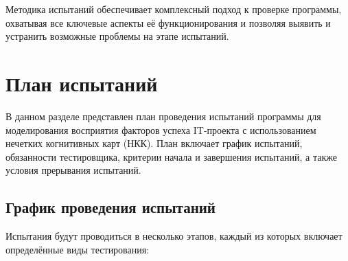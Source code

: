 \documentclass{article}
\begin{document}
    Методика испытаний обеспечивает комплексный подход к проверке программы, охватывая все ключевые аспекты её функционирования и позволяя выявить и устранить возможные проблемы на этапе испытаний.
    \newpage
    \section{План испытаний}
    В данном разделе представлен план проведения испытаний программы для моделирования восприятия факторов успеха IT-проекта с использованием нечетких когнитивных карт (НКК). План включает график испытаний, обязанности тестировщика, критерии начала и завершения испытаний, а также условия прерывания испытаний.

    \subsection{График проведения испытаний}

    Испытания будут проводиться в несколько этапов, каждый из которых включает определённые виды тестирования:
\end{document}
